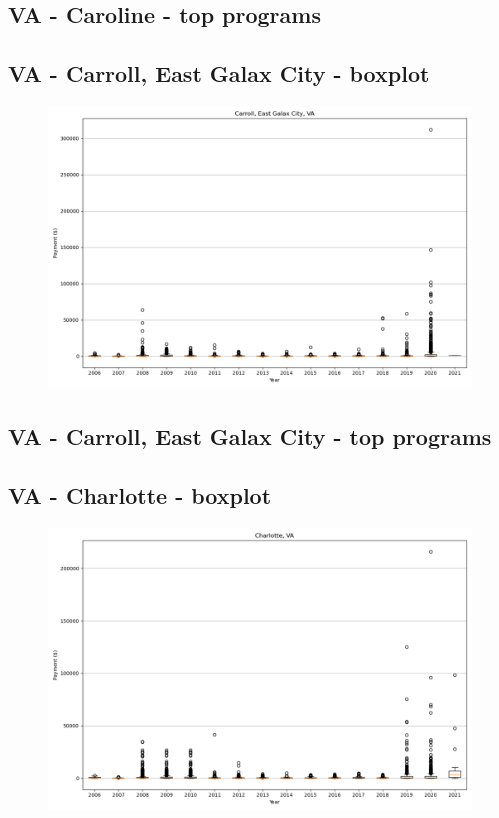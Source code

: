 \subsection*{VA - Caroline - top programs}

\newpage
\subsection*{VA - Carroll, East Galax City - boxplot}
\begin{figure}[h]
\centering
\includegraphics[width=7in]{../output/boxplots/counties/Carroll, East Galax City-VA_boxplot.png}
\end{figure}


\subsection*{VA - Carroll, East Galax City - top programs}

\newpage
\subsection*{VA - Charlotte - boxplot}
\begin{figure}[h]
\centering
\includegraphics[width=7in]{../output/boxplots/counties/Charlotte-VA_boxplot.png}
\end{figure}


